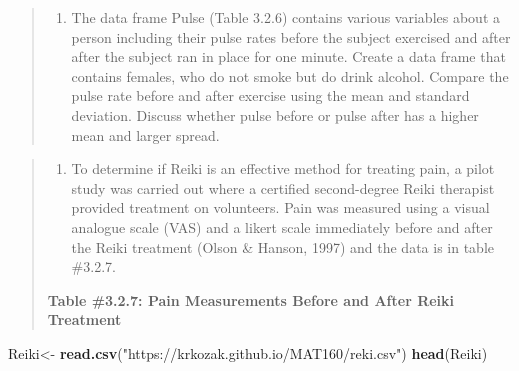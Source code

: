 \documentclass[]{book}
\newenvironment{Shaded}{\begin{snugshade}}{\end{snugshade}}
\newcommand{\KeywordTok}[1]{\textcolor[rgb]{0.13,0.29,0.53}{\textbf{#1}}}
\newcommand{\NormalTok}[1]{#1}
\newcommand{\OperatorTok}[1]{\textcolor[rgb]{0.81,0.36,0.00}{\textbf{#1}}}
\newcommand{\StringTok}[1]{\textcolor[rgb]{0.31,0.60,0.02}{#1}}
\providecommand{\tightlist}{%
  \setlength{\itemsep}{0pt}\setlength{\parskip}{0pt}}
\begin{document}
\begin{Shaded}
\end{Shaded}

\begin{quote}
\begin{enumerate}
\def\labelenumi{\arabic{enumi}.}
\setcounter{enumi}{5}
\tightlist
\item
  The data frame Pulse (Table 3.2.6) contains various variables about a person including their pulse rates before the subject exercised and after after the subject ran in place for one minute. Create a data frame that contains females, who do not smoke but do drink alcohol. Compare the pulse rate before and after exercise using the mean and standard deviation. Discuss whether pulse before or pulse after has a higher mean and larger spread.
\end{enumerate}
\end{quote}

\begin{quote}
\begin{enumerate}
\def\labelenumi{\arabic{enumi}.}
\setcounter{enumi}{6}
\tightlist
\item
  To determine if Reiki is an effective method for treating pain, a pilot study was carried out where a certified second-degree Reiki therapist provided treatment on volunteers. Pain was measured using a visual analogue scale (VAS) and a likert scale immediately before and after the Reiki treatment (Olson \& Hanson, 1997) and the data is in table \#3.2.7.
\end{enumerate}

\textbf{Table \#3.2.7: Pain Measurements Before and After Reiki Treatment}
\end{quote}

\begin{Shaded}
\begin{Highlighting}[]
\NormalTok{Reiki<-}\StringTok{ }\KeywordTok{read.csv}\NormalTok{(}\StringTok{"https://krkozak.github.io/MAT160/reki.csv"}\NormalTok{)}
\KeywordTok{head}\NormalTok{(Reiki)}
\end{Highlighting}
\end{Shaded}
\end{document}
